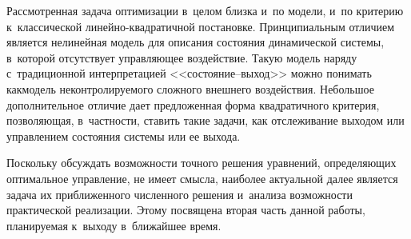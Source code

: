 \begin{multicols}{2}
     Рассмотренная задача оптимизации в~целом близка и~по модели, и~по 
критерию к~классической ли\-ней\-но-квад\-ра\-тич\-ной постановке. 
Принципиальным отличием является нелинейная модель для описания 
со\-сто\-яния динамической сис\-те\-мы, в~которой отсутствует управ\-ля\-ющее 
воздействие.\linebreak
 Такую модель наряду с~традиционной интер\-пре\-тацией  
<<со\-сто\-яние--вы\-ход>> мож\-но понимать как\linebreak модель неконтролируемого 
слож\-но\-го внешнего воздействия. Небольшое дополнительное отличие дает 
предложенная форма квад\-ра\-тич\-но\-го критерия, поз\-во\-ля\-ющая, в~част\-ности, 
ставить такие задачи, как отслеживание выходом или управ\-ле\-ни\-ем со\-сто\-яния 
сис\-те\-мы или ее выхода.
     
     Поскольку обсуждать возможности точного решения уравнений, 
определяющих оптимальное управ\-ле\-ние, не имеет смыс\-ла, наиболее 
актуальной далее является задача их приближенного чис\-лен\-но\-го решения 
и~анализа воз\-мож\-ности практической реализации. Этому посвящена вторая 
часть данной работы, пла\-ни\-ру\-емая к~выходу в~ближайшее время.


\end{multicols}
